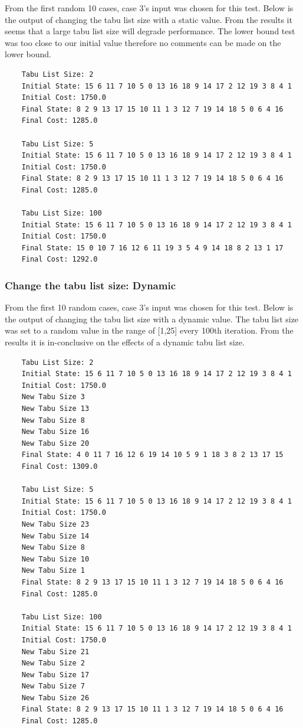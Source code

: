 \documentclass{article}
\begin{document}
From the first random 10 cases, case 3's input was chosen for this test.
Below is the output of changing the tabu list size with a static value.
From the results it seems that a large tabu list size will degrade performance.
The lower bound test was too close to our initial value therefore no comments can be made on the lower bound.

\begin{lstlisting}
    Tabu List Size: 2
    Initial State: 15 6 11 7 10 5 0 13 16 18 9 14 17 2 12 19 3 8 4 1
    Initial Cost: 1750.0
    Final State: 8 2 9 13 17 15 10 11 1 3 12 7 19 14 18 5 0 6 4 16
    Final Cost: 1285.0
    
    Tabu List Size: 5
    Initial State: 15 6 11 7 10 5 0 13 16 18 9 14 17 2 12 19 3 8 4 1
    Initial Cost: 1750.0
    Final State: 8 2 9 13 17 15 10 11 1 3 12 7 19 14 18 5 0 6 4 16
    Final Cost: 1285.0
    
    Tabu List Size: 100
    Initial State: 15 6 11 7 10 5 0 13 16 18 9 14 17 2 12 19 3 8 4 1
    Initial Cost: 1750.0
    Final State: 15 0 10 7 16 12 6 11 19 3 5 4 9 14 18 8 2 13 1 17
    Final Cost: 1292.0
\end{lstlisting}

\subsubsection{Change the tabu list size: Dynamic}

From the first 10 random cases, case 3's input was chosen for this test.
Below is the output of changing the tabu list size with a dynamic value.
The tabu list size was set to a random value in the range of [1,25] every 100th iteration.
From the results it is in-conclusive on the effects of a dynamic tabu list size.

\begin{lstlisting}
    Tabu List Size: 2
    Initial State: 15 6 11 7 10 5 0 13 16 18 9 14 17 2 12 19 3 8 4 1
    Initial Cost: 1750.0
    New Tabu Size 3
    New Tabu Size 13
    New Tabu Size 8
    New Tabu Size 16
    New Tabu Size 20
    Final State: 4 0 11 7 16 12 6 19 14 10 5 9 1 18 3 8 2 13 17 15
    Final Cost: 1309.0
    
    Tabu List Size: 5
    Initial State: 15 6 11 7 10 5 0 13 16 18 9 14 17 2 12 19 3 8 4 1
    Initial Cost: 1750.0
    New Tabu Size 23
    New Tabu Size 14
    New Tabu Size 8
    New Tabu Size 10
    New Tabu Size 1
    Final State: 8 2 9 13 17 15 10 11 1 3 12 7 19 14 18 5 0 6 4 16
    Final Cost: 1285.0
    
    Tabu List Size: 100
    Initial State: 15 6 11 7 10 5 0 13 16 18 9 14 17 2 12 19 3 8 4 1
    Initial Cost: 1750.0
    New Tabu Size 21
    New Tabu Size 2
    New Tabu Size 17
    New Tabu Size 7
    New Tabu Size 26
    Final State: 8 2 9 13 17 15 10 11 1 3 12 7 19 14 18 5 0 6 4 16
    Final Cost: 1285.0
\end{lstlisting}
\end{document}

